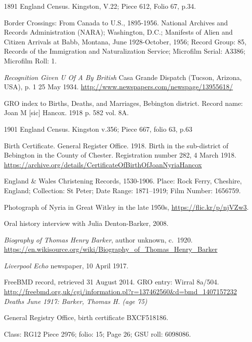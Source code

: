 \begin{thebibliography}{99}
	1891 England Census. Kingston, V.22; Piece 612, Folio 67, p.34.

	Border Crossings: From Canada to U.S., 1895-1956.
	National Archives and Records Administration (NARA); Washington, D.C.; Manifests of Alien and Citizen Arrivals at Babb, Montana, June 1928-October, 1956; Record Group: 85, Records of the Immigration and Naturalization Service; Microfilm Serial: A3386; Microfilm Roll: 1.

	\emph{Recognition Given U Of A By British}
	Casa Grande Dispatch (Tucson, Arizona, USA), p. 1 25 May 1934. \url{http://www.newspapers.com/newspage/13955618/}

	GRO index to Births, Deaths, and Marriages,
	Bebington district. Record name: Joan M [sic] Hancox.
	1918 p. 582 vol. 8A.

	1901 England Census. Kingston v.356; Piece 667, folio 63, p.63

	Birth Certificate. General Register Office.
	1918. Birth in the sub-district of Bebington in the County of Chester.
	Registration number 282, 4 March 1918.
	\url{https://archive.org/details/CertificateOfBirthOfJoanNyriaHancox}

	England \& Wales Christening Records, 1530-1906.
	Place: Rock Ferry, Cheshire, England; Collection: St Peter;
	Date Range: 1871--1919; Film Number: 1656759.

	Photograph of Nyria in Great Witley in the late 1950s,
	\url{https://flic.kr/p/njVZw3}.

	Oral history interview with Julia Denton-Barker, 2008.

	\emph{Biography of Thomas Henry Barker}, author unknown, c.\ 1920.
	\url{https://en.wikisource.org/wiki/Biography_of_Thomas_Henry_Barker}

	\emph{Liverpool Echo} newspaper, 10 April 1917.

	FreeBMD record, retrieved 31 August 2014. GRO entry: Wirral 8a/504.
	\url{http://freebmd.org.uk/cgi/information.pl?r=137462560&d=bmd_1407157232}
	\emph{Deaths June 1917: Barker, Thomas H. (age 75)}

	General Registry Office, birth certificate BXCF518186.

	Class: RG12 Piece 2976; folio: 15; Page 26; GSU roll: 6098086.


\end{thebibliography}
